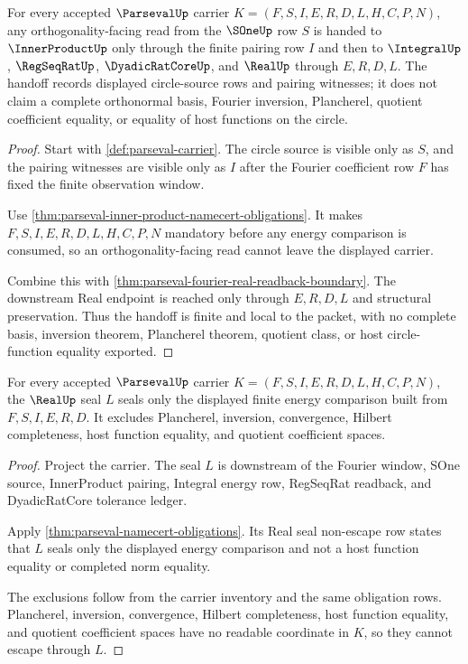 \begin{theorem}
\label{thm:parseval-sone-orthogonality-handoff}
For every accepted $\ParsevalUp$ carrier $K=(F,S,I,E,R,D,L,H,C,P,N)$, any orthogonality-facing read from the $\SOneUp$ row $S$ is handed to $\InnerProductUp$ only through the finite pairing row $I$ and then to $\IntegralUp$, $\RegSeqRatUp$, $\DyadicRatCoreUp$, and $\RealUp$ through $E,R,D,L$. The handoff records displayed circle-source rows and pairing witnesses; it does not claim a complete orthonormal basis, Fourier inversion, Plancherel, quotient coefficient equality, or equality of host functions on the circle.
\end{theorem}
\begin{proof}
Start with \autoref{def:parseval-carrier}. The circle source is visible only as $S$, and the pairing witnesses are visible only as $I$ after the Fourier coefficient row $F$ has fixed the finite observation window.

Use \autoref{thm:parseval-inner-product-namecert-obligations}. It makes $F,S,I,E,R,D,L,H,C,P,N$ mandatory before any energy comparison is consumed, so an orthogonality-facing read cannot leave the displayed carrier.

Combine this with \autoref{thm:parseval-fourier-real-readback-boundary}. The downstream Real endpoint is reached only through $E,R,D,L$ and structural preservation. Thus the handoff is finite and local to the packet, with no complete basis, inversion theorem, Plancherel theorem, quotient class, or host circle-function equality exported.
\end{proof}

\begin{theorem}
\label{thm:parseval-real-seal-nonescape}
For every accepted $\ParsevalUp$ carrier $K=(F,S,I,E,R,D,L,H,C,P,N)$, the $\RealUp$ seal $L$ seals only the displayed finite energy comparison built from $F,S,I,E,R,D$. It excludes Plancherel, inversion, convergence, Hilbert completeness, host function equality, and quotient coefficient spaces.
\end{theorem}
\begin{proof}
Project the carrier. The seal $L$ is downstream of the Fourier window, SOne source, InnerProduct pairing, Integral energy row, RegSeqRat readback, and DyadicRatCore tolerance ledger.

Apply \autoref{thm:parseval-namecert-obligations}. Its Real seal non-escape row states that $L$ seals only the displayed energy comparison and not a host function equality or completed norm equality.

The exclusions follow from the carrier inventory and the same obligation rows. Plancherel, inversion, convergence, Hilbert completeness, host function equality, and quotient coefficient spaces have no readable coordinate in $K$, so they cannot escape through $L$.
\end{proof}

